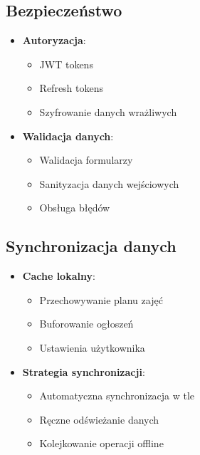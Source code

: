 \subsection{Bezpieczeństwo}

\begin{itemize}
  \item \textbf{Autoryzacja}:
        \begin{itemize}
          \item JWT tokens
          \item Refresh tokens
          \item Szyfrowanie danych wrażliwych
        \end{itemize}
        
  \item \textbf{Walidacja danych}:
        \begin{itemize}
          \item Walidacja formularzy
          \item Sanityzacja danych wejściowych
          \item Obsługa błędów
        \end{itemize}
\end{itemize}

\subsection{Synchronizacja danych}

\begin{itemize}
  \item \textbf{Cache lokalny}:
        \begin{itemize}
          \item Przechowywanie planu zajęć
          \item Buforowanie ogłoszeń
          \item Ustawienia użytkownika
        \end{itemize}
        
  \item \textbf{Strategia synchronizacji}:
        \begin{itemize}
          \item Automatyczna synchronizacja w tle
          \item Ręczne odświeżanie danych
          \item Kolejkowanie operacji offline
        \end{itemize}
\end{itemize}
